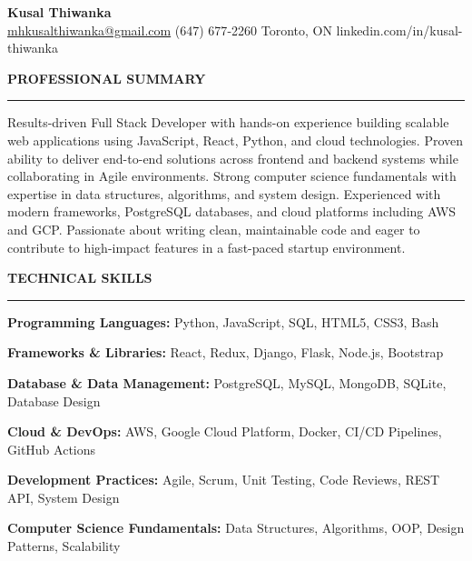 \documentclass[10pt,letterpaper]{article}
\begin{document}
\begin{center}
{\LARGE\textbf{Kusal Thiwanka}}\\[3pt]
\href{mailto:mhkusalthiwanka@gmail.com}{mhkusalthiwanka@gmail.com}\hspace{2em}%
(647) 677{-}2260\hspace{2em}%
Toronto, ON\hspace{2em}
linkedin.com/in/kusal-thiwanka
\end{center}

\vspace{6pt}

\textbf{PROFESSIONAL SUMMARY}\\[-8pt]
\noindent\rule{\textwidth}{1pt}

\vspace{-2pt}

Results-driven Full Stack Developer with hands-on experience building scalable web applications using JavaScript, React, Python, and cloud technologies. Proven ability to deliver end-to-end solutions across frontend and backend systems while collaborating in Agile environments. Strong computer science fundamentals with expertise in data structures, algorithms, and system design. Experienced with modern frameworks, PostgreSQL databases, and cloud platforms including AWS and GCP. Passionate about writing clean, maintainable code and eager to contribute to high-impact features in a fast-paced startup environment.

\vspace{8pt}

\textbf{TECHNICAL SKILLS}\\[-8pt]
\noindent\rule{\textwidth}{1pt}

\vspace{-2pt}

\textbf{Programming Languages:} Python, JavaScript, SQL, HTML5, CSS3, Bash

\textbf{Frameworks \& Libraries:} React, Redux, Django, Flask, Node.js, Bootstrap

\textbf{Database \& Data Management:} PostgreSQL, MySQL, MongoDB, SQLite, Database Design

\textbf{Cloud \& DevOps:} AWS, Google Cloud Platform, Docker, CI/CD Pipelines, GitHub Actions

\textbf{Development Practices:} Agile, Scrum, Unit Testing, Code Reviews, REST API, System Design

\textbf{Computer Science Fundamentals:} Data Structures, Algorithms, OOP, Design Patterns, Scalability
\end{document}
